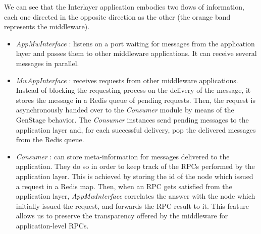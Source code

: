 We can see that the Interlayer application embodies two flows of information, each
one directed in the opposite direction as the other (the orange band represents
the middleware).
\begin{itemize}
\item \textit{AppMwInterface} : listens on a port waiting for messages
from the application layer and passes them to other middleware applications.
It can receive several messages in parallel.

\item \textit{MwAppInterface} : receives requests from other middleware applications.
Instead of blocking the requesting process
on the delivery of the message, it stores the message
in a Redis queue of pending requests. Then, the request is
asynchronously handed over to the \textit{Consumer} module by means of the
GenStage behavior. The \textit{Consumer} instances send
pending messages to the application layer and, for each successful delivery,
pop the delivered messages from the Redis queue.

\item \textit{Consumer} : can store meta-information for messages delivered to
the application. They do so in order to keep track of the RPCs performed by the
application layer. This is achieved by storing the id of the node which issued a
request in a Redis map. Then, when an RPC gets satisfied from the
application layer, \textit{AppMwInterface} correlates the answer with the
node which initially issued the request, and forwards the RPC result to it.
This feature allows us to preserve the transparency offered by the
middleware for application-level RPCs.

\end{itemize}
